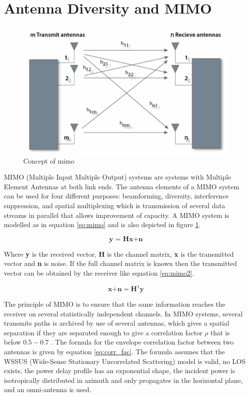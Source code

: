 \section{Antenna Diversity and MIMO}

\begin{figure}[H]
\centering 
\includegraphics[scale = 0.4]{figures/ch1/mimo.png}
\caption{Concept of mimo}
\label{fig:mimo}
\end{figure}

MIMO (Multiple Input Multiple Output) systems are systems with Multiple Element Antennas at both link ends. The antenna elements of a MIMO system can be used for four different purposes: beamforming, diversity, interference suppression, and spatial multiplexing which is transmission of several data streams in parallel that allows improvement of capacity. A MIMO system is modelled as in equation \ref{eq:mimo} and is also depicted in figure \ref{fig:mimo}.

\begin{equation}\label{eq:mimo}
\textbf{y = Hx+n}
\end{equation}  

Where \textbf{y} is the received vector, \textbf{H} is the channel matrix, \textbf{x} is the transmitted vector and \textbf{n} is noise. If the full channel matrix is known then the transmitted vector can be obtained by the receiver like equation \ref{eq:mimo2}.  

\begin{equation}\label{eq:mimo2}
\textbf{x+n} = \textbf{H}^{1} \textbf{y}
\end{equation}  

The principle of MIMO is to ensure that the same information reaches the receiver on several
statistically independent channels. In MIMO systems, several transmits paths is archived by use of several antennas, which gives a spatial separation if they are separated enough to give a correlation factor $\rho$ that is below $0.5 - 0.7$ \citep{molisch2011}. The formula for the envelope correlation factor between two antennas is given by equation \ref{eq:corr_fac}. The formula assumes that the WSSUS (Wide-Sense Stationary Uncorrelated Scattering) model is valid, no LOS exists, the power delay profile has an exponential shape, the incident power is isotropically distributed in azimuth and only propagates in the horizontal plane, and an omni-antenna is used.

